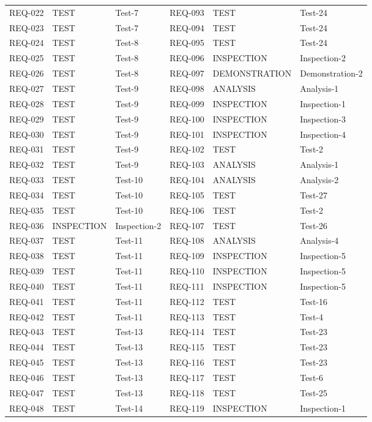 \documentclass[11pt,a4paper]{article}
\begin{document}
{\begin{xltabular}{\textwidth}{@{}lll@{\hspace{1.2em}}lll@{}}
REQ-022 & TEST & Test-7 & REQ-093 & TEST & Test-24 \\
REQ-023 & TEST & Test-7 & REQ-094 & TEST & Test-24 \\
REQ-024 & TEST & Test-8 & REQ-095 & TEST & Test-24 \\
REQ-025 & TEST & Test-8 & REQ-096 & INSPECTION & Inspection-2 \\
REQ-026 & TEST & Test-8 & REQ-097 & DEMONSTRATION & Demonstration-2 \\
REQ-027 & TEST & Test-9 & REQ-098 & ANALYSIS & Analysis-1 \\
REQ-028 & TEST & Test-9 & REQ-099 & INSPECTION & Inspection-1 \\
REQ-029 & TEST & Test-9 & REQ-100 & INSPECTION & Inspection-3 \\
REQ-030 & TEST & Test-9 & REQ-101 & INSPECTION & Inspection-4 \\
REQ-031 & TEST & Test-9 & REQ-102 & TEST & Test-2 \\
REQ-032 & TEST & Test-9 & REQ-103 & ANALYSIS & Analysis-1 \\
REQ-033 & TEST & Test-10 & REQ-104 & ANALYSIS & Analysis-2 \\
REQ-034 & TEST & Test-10 & REQ-105 & TEST & Test-27 \\
REQ-035 & TEST & Test-10 & REQ-106 & TEST & Test-2 \\
REQ-036 & INSPECTION & Inspection-2 & REQ-107 & TEST & Test-26 \\
REQ-037 & TEST & Test-11 & REQ-108 & ANALYSIS & Analysis-4 \\
REQ-038 & TEST & Test-11 & REQ-109 & INSPECTION & Inspection-5 \\
REQ-039 & TEST & Test-11 & REQ-110 & INSPECTION & Inspection-5 \\
REQ-040 & TEST & Test-11 & REQ-111 & INSPECTION & Inspection-5 \\
REQ-041 & TEST & Test-11 & REQ-112 & TEST & Test-16 \\
REQ-042 & TEST & Test-11 & REQ-113 & TEST & Test-4 \\
REQ-043 & TEST & Test-13 & REQ-114 & TEST & Test-23 \\
REQ-044 & TEST & Test-13 & REQ-115 & TEST & Test-23 \\
REQ-045 & TEST & Test-13 & REQ-116 & TEST & Test-23 \\
REQ-046 & TEST & Test-13 & REQ-117 & TEST & Test-6 \\
REQ-047 & TEST & Test-13 & REQ-118 & TEST & Test-25 \\
REQ-048 & TEST & Test-14 & REQ-119 & INSPECTION & Inspection-1 \\

\end{xltabular}}
\end{document}

